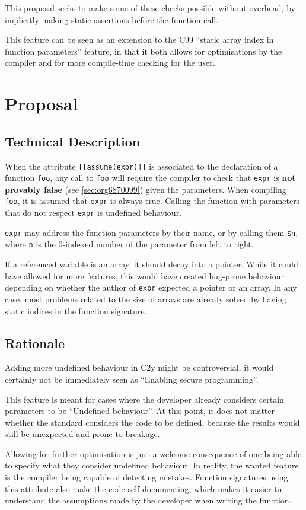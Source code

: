 \documentclass[a4paper, 12pt]{article}
\begin{document}
This proposal seeks to make some of these checks possible without overhead, by implicitly
making static assertions before the function call.

This feature can be seen as an extension to the C99 ``static array index in
function parameters'' feature, in that it both allows for optimisations by the
compiler and for more compile-time checking for the user.
\section{Proposal}
\label{sec:orgdbefd92}
\subsection{Technical Description}
\label{sec:orgeb6cdfa}
When the attribute \texttt{[[assume(expr)]]} is associated to the declaration of a
function \texttt{foo}, any call to \texttt{foo} will require the compiler to check that \texttt{expr}
is \textbf{not provably false} (see \ref{sec:org6870099}) given the parameters.
When compiling \texttt{foo}, it is assumed that \texttt{expr} is always true.  Calling the
function with parameters that do not respect \texttt{expr} is undefined behaviour.

\texttt{expr} may address the function parameters by their name, or by calling them
\texttt{\$n}, where \texttt{n} is the 0-indexed number of the parameter from left to right.

If a referenced variable is an array, it should decay into a pointer.  While it
could have allowed for more features, this would have created bug-prone behaviour
depending on whether the author of \texttt{expr} expected a pointer or an array.  In any
case, most problems related to the size of arrays are already solved by having
static indices in the function signature.
\subsection{Rationale}
\label{sec:orgcad1d61}
Adding more undefined behaviour in C2y might be controversial, it would certainly
not be immediately seen as ``Enabling secure programming''.

This feature is meant for cases where the developer already considers certain
parameters to be ``Undefined behaviour''.  At this point, it does not matter
whether the standard considers the code to be defined, because the results would
still be unexpected and prone to breakage.

Allowing for further optimisation is just a welcome consequence of one being able
to specify what they consider undefined behaviour.  In reality, the wanted feature is the compiler
being capable of detecting mistakes.  Function signatures using this attribute also
make the code self-documenting, which makes it easier to understand the assumptions made by the developer
when writing the function.
\end{document}
